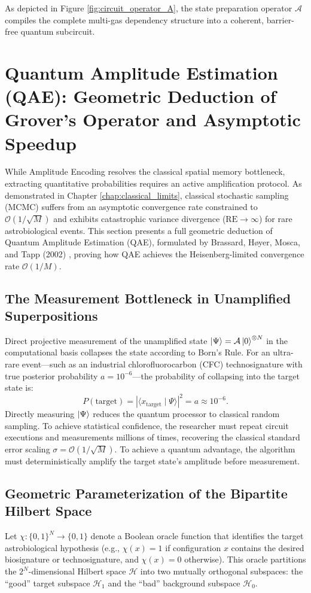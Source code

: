 As depicted in Figure \ref{fig:circuit_operator_A}, the state preparation operator $\mathcal{A}$ compiles the complete multi-gas dependency structure into a coherent, barrier-free quantum subcircuit.

\section{Quantum Amplitude Estimation (QAE): Geometric Deduction of Grover's Operator and Asymptotic Speedup}\label{sec:qae_derivation_speedup}

While Amplitude Encoding resolves the classical spatial memory bottleneck, extracting quantitative probabilities requires an active amplification protocol. As demonstrated in Chapter \ref{chap:classical_limits}, classical stochastic sampling (MCMC) suffers from an asymptotic convergence rate constrained to $\mathcal{O}(1/\sqrt{M})$ and exhibits catastrophic variance divergence ($\mathrm{RE} \to \infty$) for rare astrobiological events. This section presents a full geometric deduction of Quantum Amplitude Estimation (QAE), formulated by Brassard, H{\o}yer, Mosca, and Tapp (2002) \cite{brassard2002}, proving how QAE achieves the Heisenberg-limited convergence rate $\mathcal{O}(1/M)$.

\subsection{The Measurement Bottleneck in Unamplified Superpositions}
Direct projective measurement of the unamplified state $\left|\Psi\right\rangle = \mathcal{A}\left|0\right\rangle^{\otimes N}$ in the computational basis collapses the state according to Born's Rule. For an ultra-rare event---such as an industrial chlorofluorocarbon (CFC) technosignature with true posterior probability $a = 10^{-6}$---the probability of collapsing into the target state is:
\begin{equation}
P(\mathrm{target}) = |\langle x_{\mathrm{target}} \mid \Psi \rangle|^2 = a \approx 10^{-6}.
\end{equation}
Directly measuring $\left|\Psi\right\rangle$ reduces the quantum processor to classical random sampling. To achieve statistical confidence, the researcher must repeat circuit executions and measurements millions of times, recovering the classical standard error scaling $\sigma = \mathcal{O}(1/\sqrt{M})$. To achieve a quantum advantage, the algorithm must deterministically amplify the target state's amplitude before measurement.

\subsection{Geometric Parameterization of the Bipartite Hilbert Space}
Let $\chi: \{0, 1\}^N \to \{0, 1\}$ denote a Boolean oracle function that identifies the target astrobiological hypothesis (e.g., $\chi(x) = 1$ if configuration $x$ contains the desired biosignature or technosignature, and $\chi(x) = 0$ otherwise). This oracle partitions the $2^N$-dimensional Hilbert space $\mathcal{H}$ into two mutually orthogonal subspaces: the ``good'' target subspace $\mathcal{H}_1$ and the ``bad'' background subspace $\mathcal{H}_0$.

